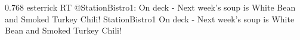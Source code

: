 
{0.768}
{\joinNameTweet
{esterrick}
{RT @StationBistro1: On deck - Next week's soup is White Bean and Smoked Turkey Chili!}}
{\joinNameTweet
{StationBistro1}
{On deck - Next week's soup is White Bean and Smoked Turkey Chili!}}
%

%
%

